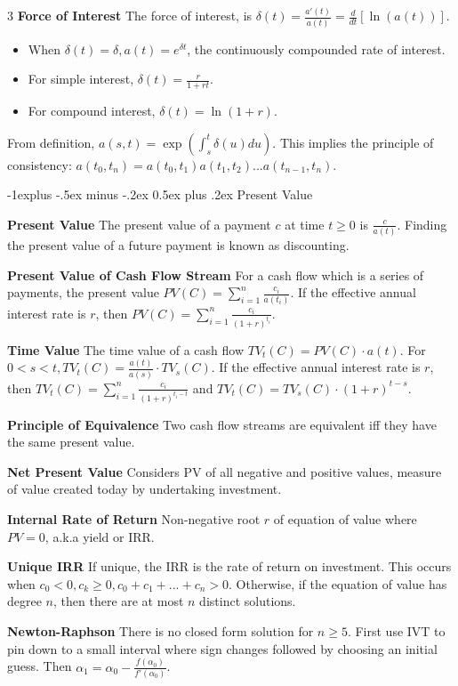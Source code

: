 \documentclass[10pt, landscape]{article}
\makeatletter
\renewcommand{\section}{\@startsection{section}{1}{0mm}%
                                {-1ex plus -.5ex minus -.2ex}%
                                {0.5ex plus .2ex}%
                                {\normalfont\large\bfseries}}
\renewcommand{\section}{\@startsection{section}{2}{0mm}%
                                {-1explus -.5ex minus -.2ex}%
                                {0.5ex plus .2ex}%
                                {\normalfont\normalsize\bfseries}}
\makeatother
\begin{document}
\begin{multicols*}{3}
\textbf{Force of Interest} The force of interest, is $\delta(t)=\frac{a'(t)}{a(t)}=\frac{d}{dt}[\ln(a(t))]$.
\begin{itemize}
    \item When $\delta(t)=\delta, a(t)=e^{\delta t}$, the continuously compounded rate of interest.
    \item For simple interest, $\delta(t)=\frac{r}{1+rt}$.
    \item For compound interest, $\delta(t)=\ln(1+r)$.
\end{itemize}
From definition, $a(s,t)=\exp(\int_s^t\delta(u)du)$. This implies the principle of consistency: $a(t_0, t_n)=a(t_0, t_1)a(t_1,t_2)...a(t_{n-1},t_n)$.

\section{Present Value}

\textbf{Present Value} The present value of a payment $c$ at time $t \geq0$ is $\frac{c}{a(t)}$. Finding the present value of a future payment is known as discounting.

\textbf{Present Value of Cash Flow Stream} For a cash flow which is a series of payments, the present value $PV(C)=\sum_{i=1}^n\frac{c_i}{a(t_i)}$. If the effective annual interest rate is $r$, then $PV(C)=\sum_{i=1}^n\frac{c_i}{(1+r)^{t_i}}$.

\textbf{Time Value} The time value of a cash flow $TV_t(C)=PV(C) \cdot a(t)$. For $0<s<t, TV_t(C)=\frac{a(t)}{a(s)}\cdot TV_s(C)$. If the effective annual interest rate is $r$, then $TV_t(C)=\sum_{i=1}^n\frac{c_i}{(1+r)^{t_i-t}}$ and $TV_t(C)=TV_s(C)\cdot (1+r)^{t-s}$.

\textbf{Principle of Equivalence} Two cash flow streams are equivalent iff they have the same present value.

\textbf{Net Present Value} Considers PV of all negative and positive values, measure of value created today by undertaking investment.

\textbf{Internal Rate of Return} Non-negative root $r$ of equation of value where $PV=0$, a.k.a yield or IRR.

\textbf{Unique IRR} If unique, the IRR is the rate of return on investment. This occurs when $c_0 < 0, c_k \geq 0, c_0+c_1+...+c_n >0$. Otherwise, if the equation of value has degree $n$, then there are at most $n$ distinct solutions.

\textbf{Newton-Raphson} There is no closed form solution for $n\geq 5$. First use IVT to pin down to a small interval where sign changes followed by choosing an initial guess. Then $\alpha_1=\alpha_0-\frac{f(\alpha_0)}{f'(\alpha_0)}$.


\end{multicols*}
\end{document}
